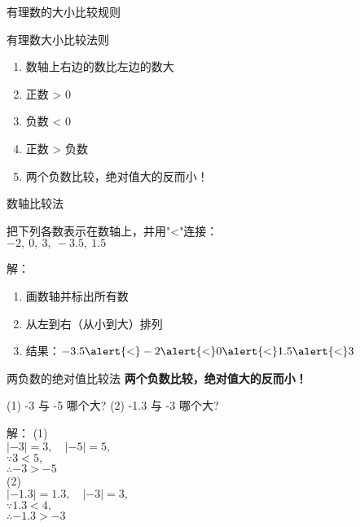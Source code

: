 \begin{frame}{有理数的大小比较规则}
\begin{block}{有理数大小比较法则}
\begin{enumerate}[label={\arabic*.}]
  \item 数轴上右边的数比左边的数\alert{大}
  \item 正数 \alert{>} 0
  \item 负数 \alert{<} 0
  \item 正数 \alert{>} 负数
  \item 两个负数比较，绝对值大的反而\alert{小}！
\end{enumerate}
\end{block}

\end{frame}

\begin{frame}{数轴比较法}
\begin{example}
  把下列各数表示在数轴上，并用"<"连接：\\
  $-2,\ 0,\ 3,\ -3.5,\ 1.5$
\end{example}

\pause
\begin{block}{解：}
\begin{enumerate}[label={\arabic*.}]
  \item 画数轴并标出所有数
  \begin{figure}
  \end{figure}
  \item 从左到右（从小到大）排列
  \item 结果：$-3.5 \alert{<} -2 \alert{<}  0 \alert{<}  1.5 \alert{<}  3$
\end{enumerate}
\end{block}
\end{frame}

\begin{frame}{两负数的绝对值比较法}
\textbf{两个负数比较，绝对值大的反而\alert{小}！}
\begin{example}
(1) -3 与 -5 哪个大? (2) -1.3 与 -3 哪个大?\\
\end{example}
\pause
\begin{block}{解：}
(1) \\
$| -3 | = 3, \quad | -5 | = 5, $ \\
$\because 3 < 5, $ \\
$\therefore -3 > -5$ \\
(2) \\
$| -1.3 | = 1.3, \quad |-3| = 3, $ \\
$\because 1.3 < 4, $\\
$\therefore -1.3 > -3$
\end{block}
\end{frame}